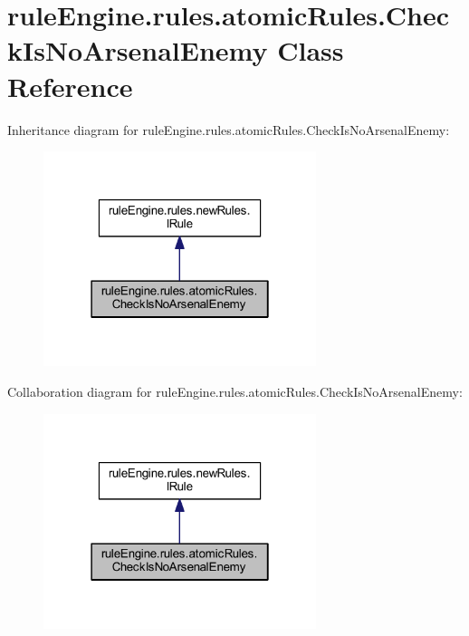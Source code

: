 \hypertarget{classrule_engine_1_1rules_1_1atomic_rules_1_1_check_is_no_arsenal_enemy}{}\section{rule\+Engine.\+rules.\+atomic\+Rules.\+Check\+Is\+No\+Arsenal\+Enemy Class Reference}
\label{classrule_engine_1_1rules_1_1atomic_rules_1_1_check_is_no_arsenal_enemy}


Inheritance diagram for rule\+Engine.\+rules.\+atomic\+Rules.\+Check\+Is\+No\+Arsenal\+Enemy\+:
\nopagebreak
\begin{figure}[H]
\begin{center}
\leavevmode
\includegraphics[width=226pt]{classrule_engine_1_1rules_1_1atomic_rules_1_1_check_is_no_arsenal_enemy__inherit__graph}
\end{center}
\end{figure}


Collaboration diagram for rule\+Engine.\+rules.\+atomic\+Rules.\+Check\+Is\+No\+Arsenal\+Enemy\+:
\nopagebreak
\begin{figure}[H]
\begin{center}
\leavevmode
\includegraphics[width=226pt]{classrule_engine_1_1rules_1_1atomic_rules_1_1_check_is_no_arsenal_enemy__coll__graph}
\end{center}
\end{figure}
